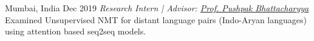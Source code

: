 \begin{experiences}
{{    }}{Mumbai, India}{}
    {Dec 2019} {\textit{Research Intern | Advisor: \href{https://www.cse.iitb.ac.in/~pb/}{Prof. Pushpak Bhattacharyya}}\\
    Examined Unsupervised NMT for distant language pairs (Indo-Aryan languages) using attention based seq2seq models.
    }
    
  
\end{experiences}
\vspace{-4mm}
